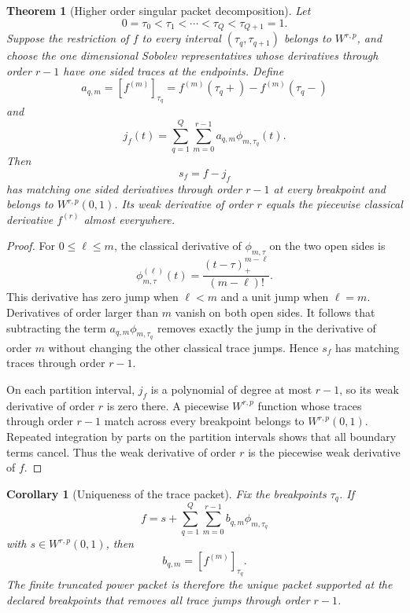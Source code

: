 \documentclass[11pt,letterpaper]{article}
\newtheorem{theorem}{Theorem}[section]
\theoremstyle{plain}
\theoremstyle{plain}
\theoremstyle{plain}
\newtheorem{corollary}[corollary]{Corollary}
\theoremstyle{definition}
\theoremstyle{definition}
\theoremstyle{definition}
\theoremstyle{definition}
\theoremstyle{remark}
\theoremstyle{remark}
\theoremstyle{remark}
\theoremstyle{remark}
\newcommand{\jump}[1]{\left[#1\right]}
\begin{document}
\begin{theorem}[Higher order singular packet decomposition]\label{thm:higher_order_packet_decomposition}
Let
\[
0=\tau_0<\tau_1<\cdots<\tau_Q<\tau_{Q+1}=1.
\]
Suppose the restriction of \(f\) to every interval \((\tau_q,\tau_{q+1})\) belongs to \(W^{r,p}\), and choose the one dimensional Sobolev representatives whose derivatives through order \(r-1\) have one sided traces at the endpoints. Define
\[
a_{q,m}
=
\jump{f^{(m)}}_{\tau_q}
=
f^{(m)}(\tau_q+)-f^{(m)}(\tau_q-)
\]
and
\[
j_f(t)
=
\sum_{q=1}^{Q}\sum_{m=0}^{r-1}a_{q,m}\phi_{m,\tau_q}(t).
\]
Then
\[
s_f=f-j_f
\]
has matching one sided derivatives through order \(r-1\) at every breakpoint and belongs to \(W^{r,p}(0,1)\). Its weak derivative of order \(r\) equals the piecewise classical derivative \(f^{(r)}\) almost everywhere.
\end{theorem}

\begin{proof}
For \(0\leq \ell\leq m\), the classical derivative of \(\phi_{m,\tau}\) on the two open sides is
\[
\phi_{m,\tau}^{(\ell)}(t)
=
\frac{(t-\tau)_+^{m-\ell}}{(m-\ell)!}.
\]
This derivative has zero jump when \(\ell<m\) and a unit jump when \(\ell=m\). Derivatives of order larger than \(m\) vanish on both open sides. It follows that subtracting the term \(a_{q,m}\phi_{m,\tau_q}\) removes exactly the jump in the derivative of order \(m\) without changing the other classical trace jumps. Hence \(s_f\) has matching traces through order \(r-1\).

On each partition interval, \(j_f\) is a polynomial of degree at most \(r-1\), so its weak derivative of order \(r\) is zero there. A piecewise \(W^{r,p}\) function whose traces through order \(r-1\) match across every breakpoint belongs to \(W^{r,p}(0,1)\). Repeated integration by parts on the partition intervals shows that all boundary terms cancel. Thus the weak derivative of order \(r\) is the piecewise weak derivative of \(f\).
\end{proof}

\begin{corollary}[Uniqueness of the trace packet]\label{cor:trace_packet_uniqueness}
Fix the breakpoints \(\tau_q\). If
\[
f=s+\sum_{q=1}^{Q}\sum_{m=0}^{r-1}b_{q,m}\phi_{m,\tau_q}
\]
with \(s\in W^{r,p}(0,1)\), then
\[
b_{q,m}=\jump{f^{(m)}}_{\tau_q}.
\]
The finite truncated power packet is therefore the unique packet supported at the declared breakpoints that removes all trace jumps through order \(r-1\).
\end{corollary}
\end{document}
